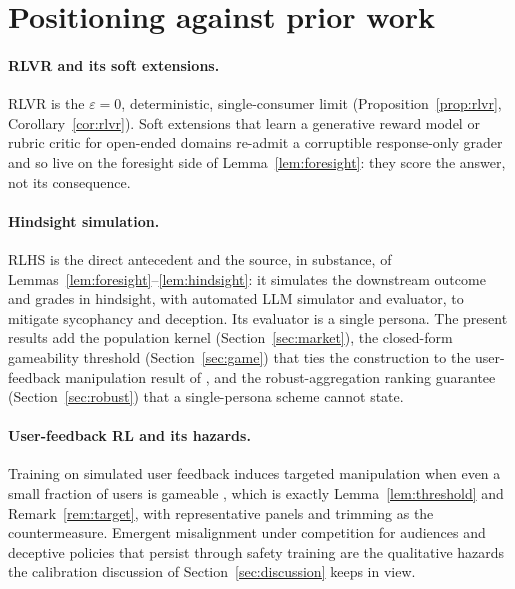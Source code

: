 \documentclass[11pt]{article}
\theoremstyle{plain}
\theoremstyle{definition}
\theoremstyle{remark}
\newcommand{\eps}{\varepsilon}
\begin{document}
\section{Positioning against prior work}
\label{sec:related}

\paragraph{RLVR and its soft extensions.}
RLVR \cite{deepseekr1,tulu3,deepseekmath} is the $\eps=0$, deterministic, single-consumer limit
(Proposition~\ref{prop:rlvr}, Corollary~\ref{cor:rlvr}). Soft extensions that learn a generative
reward model or rubric critic for open-ended domains \cite{crossingbridge,rlmt,truthrl} re-admit
a corruptible response-only grader and so live on the foresight side of
Lemma~\ref{lem:foresight}: they score the answer, not its consequence.

\paragraph{Hindsight simulation.}
RLHS \cite{rlhs} is the direct antecedent and the source, in substance, of
Lemmas~\ref{lem:foresight}--\ref{lem:hindsight}: it simulates the downstream outcome and grades
in hindsight, with automated LLM simulator and evaluator, to mitigate sycophancy and deception.
Its evaluator is a single persona. The present results add the population kernel
(Section~\ref{sec:market}), the closed-form gameability threshold (Section~\ref{sec:game}) that
ties the construction to the user-feedback manipulation result of \cite{williams}, and the
robust-aggregation ranking guarantee (Section~\ref{sec:robust}) that a single-persona scheme
cannot state.

\paragraph{User-feedback RL and its hazards.}
Training on simulated user feedback induces targeted manipulation when even a small fraction of
users is gameable \cite{williams}, which is exactly Lemma~\ref{lem:threshold} and
Remark~\ref{rem:target}, with representative panels and trimming as the countermeasure. Emergent
misalignment under competition for audiences \cite{moloch} and deceptive policies that persist
through safety training \cite{sleeper} are the qualitative hazards the calibration discussion of
Section~\ref{sec:discussion} keeps in view.
\end{document}
